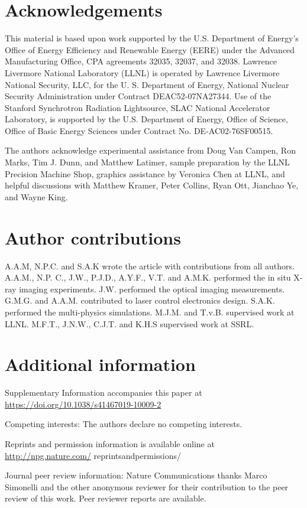 \documentclass[10pt]{article}
\begin{document}
\section*{Acknowledgements}
This material is based upon work supported by the U.S. Department of Energy's Office of Energy Efficiency and Renewable Energy (EERE) under the Advanced Manufacturing Office, CPA agreements 32035, 32037, and 32038. Lawrence Livermore National Laboratory (LLNL) is operated by Lawrence Livermore National Security, LLC, for the U. S. Department of Energy, National Nuclear Security Administration under Contract DEAC52-07NA27344. Use of the Stanford Synchrotron Radiation Lightsource, SLAC National Accelerator Laboratory, is supported by the U.S. Department of Energy, Office of Science, Office of Basic Energy Sciences under Contract No. DE-AC02-76SF00515.

The authors acknowledge experimental assistance from Doug Van Campen, Ron Marks, Tim J. Dunn, and Matthew Latimer, sample preparation by the LLNL Precision Machine Shop, graphics assistance by Veronica Chen at LLNL, and helpful discussions with Matthew Kramer, Peter Collins, Ryan Ott, Jianchao Ye, and Wayne King.

\section*{Author contributions}
A.A.M, N.P.C. and S.A.K wrote the article with contributions from all authors. A.A.M., N.P. C., J.W., P.J.D., A.Y.F., V.T. and A.M.K. performed the in situ X-ray imaging experiments. J.W. performed the optical imaging measurements. G.M.G. and A.A.M. contributed to laser control electronics design. S.A.K. performed the multi-physics simulations. M.J.M. and T.v.B. supervised work at LLNL. M.F.T., J.N.W., C.J.T. and K.H.S supervised work at SSRL.

\section*{Additional information}
Supplementary Information accompanies this paper at \href{https://doi.org/10.1038/s41467019-10009-2}{https://doi.org/10.1038/s41467019-10009-2}

Competing interests: The authors declare no competing interests.

Reprints and permission information is available online at \href{http://npg.nature.com/}{http://npg.nature.com/} reprintsandpermissions/

Journal peer review information: Nature Communications thanks Marco Simonelli and the other anonymous reviewer for their contribution to the peer review of this work. Peer reviewer reports are available.
\end{document}
